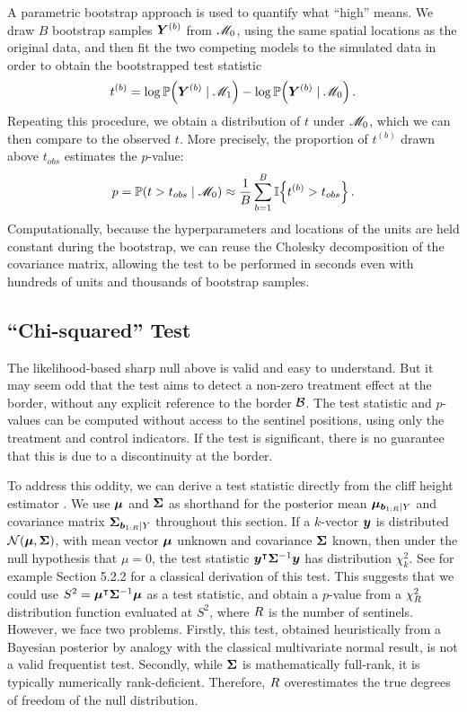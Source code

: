 	A parametric bootstrap approach is used to quantify what ``high'' means. We draw \(B\) bootstrap samples \(\bm{Y}^{(b)}\) from \(\mathscr{M}_0\),
using the same spatial locations as the original data,
and then fit the two competing models to the simulated data in order to obtain the bootstrapped test statistic
\begin{equation}
    t^{(b)} = \log \Pr\del{\Yvec^{(b)} \mid \modalt} - \log \Pr\del{\Yvec^{(b)} \mid \modnull}\,.
\end{equation}
Repeating this procedure, we obtain a distribution of \(t\) under \(\mathscr{M}_0\),
which we can then compare to the observed \(t\).
More precisely, the proportion of \(t^{(b)}\) drawn above \(t_{obs}\) estimates the \(p\)-value:
\begin{equation}
    p = \Pr\del{t > t_{obs} \mid \modnull}
                     \approx \frac{1}{B} \sum_{b=1}^B \Ind\cbr{t^{(b)} > t_{obs}}
                     \,.
\end{equation}
Computationally, because the hyperparameters and locations of the units are held constant during the bootstrap, we can reuse the Cholesky decomposition of the covariance matrix, allowing the test to be performed in seconds even with hundreds of units and thousands of bootstrap samples.

\subsection{``Chi-squared'' Test}
The likelihood-based sharp null above is valid and easy to understand.
But it may seem odd that the test aims to detect a non-zero treatment effect at the border, without any explicit reference to the border \(\mathcal{B}\).
The test statistic and \(p\)-values can be computed without access to the sentinel positions, using only the treatment and control indicators.
If the test is significant, there is no guarantee that this is due to a discontinuity at the border.

	To address this oddity, we can derive a test statistic directly from the cliff height estimator .
We use \(\bm{\mu}\) and \(\bm{\Sigma}\) as shorthand for the posterior mean \(\bm{\mu}_{\bm{b}_{1:R} \mid Y}\)
and covariance matrix \(\bm{\Sigma}_{\bm{b}_{1:R} \mid Y}\) throughout this section.
If a \(k\)-vector \(\bm{y}\) is distributed \(\normal\del{\muvec, \SigmaMat}\), with mean vector \(\bm{\mu}\) unknown and covariance \(\bm{\Sigma}\) known, then under the null hypothesis that \(\mu=0\), the test statistic \(\bm{y}^{\intercal} \bm{\Sigma}^{-1} \bm{y}\) has distribution \(\chi^2_k\).
See for example \cite{rencher2003methods} Section 5.2.2 for a classical derivation of this test.
This suggests that we could use \(S^2=\bm{\mu}^{\intercal} \bm{\Sigma}^{-1} \bm{\mu}\) as a test statistic,
and obtain a \(p\)-value from a \(\chi^2_R\) distribution function evaluated at \(S^2\), where \(R\) is the number of sentinels.
However, we face two problems.
Firstly, this test, obtained heuristically from a Bayesian posterior by analogy with the classical multivariate normal result, is not a valid frequentist test.
Secondly, while \(\bm{\Sigma}\) is mathematically full-rank, it is typically numerically rank-deficient.
Therefore, \(R\) overestimates the true degrees of freedom of the null distribution.

